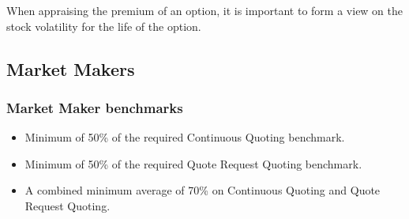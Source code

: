 \documentclass[12pt, a4paper]{article}
\begin{document}
When appraising the premium of an option, it is important to form a view on the stock volatility for the life of the option.

\pagebreak
\subsection*{Market Makers}
\subsubsection*{Market Maker benchmarks}
\begin{itemize}
    \item Minimum of 50\% of the required Continuous Quoting benchmark.
    \item Minimum of 50\% of the required Quote Request Quoting benchmark.
    \item A combined minimum average of 70\% on Continuous Quoting and Quote Request Quoting.
\end{itemize}
\end{document}
